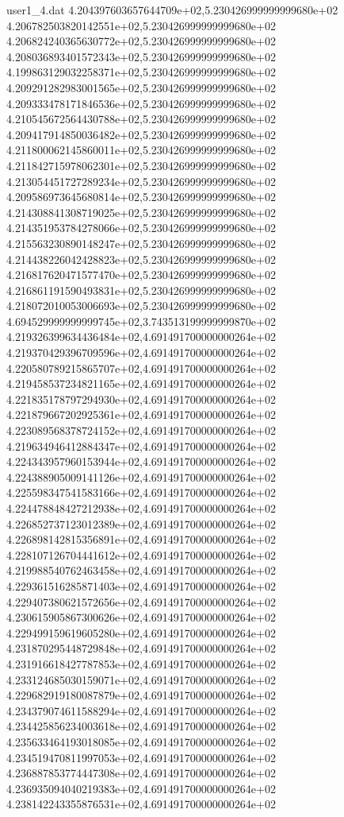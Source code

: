\begin{filecontents}{user1_4.dat}
4.204397603657644709e+02,5.230426999999999680e+02
4.206782503820142551e+02,5.230426999999999680e+02
4.206824240365630772e+02,5.230426999999999680e+02
4.208036893401572343e+02,5.230426999999999680e+02
4.199863129032258371e+02,5.230426999999999680e+02
4.209291282983001565e+02,5.230426999999999680e+02
4.209333478171846536e+02,5.230426999999999680e+02
4.210545672564430788e+02,5.230426999999999680e+02
4.209417914850036482e+02,5.230426999999999680e+02
4.211800062145860011e+02,5.230426999999999680e+02
4.211842715978062301e+02,5.230426999999999680e+02
4.213054451727289234e+02,5.230426999999999680e+02
4.209586973645680814e+02,5.230426999999999680e+02
4.214308841308719025e+02,5.230426999999999680e+02
4.214351953784278066e+02,5.230426999999999680e+02
4.215563230890148247e+02,5.230426999999999680e+02
4.214438226042428823e+02,5.230426999999999680e+02
4.216817620471577470e+02,5.230426999999999680e+02
4.216861191590493831e+02,5.230426999999999680e+02
4.218072010053006693e+02,5.230426999999999680e+02
4.694529999999999745e+02,3.743513199999999870e+02
4.219326399634436484e+02,4.691491700000000264e+02
4.219370429396709596e+02,4.691491700000000264e+02
4.220580789215865707e+02,4.691491700000000264e+02
4.219458537234821165e+02,4.691491700000000264e+02
4.221835178797294930e+02,4.691491700000000264e+02
4.221879667202925361e+02,4.691491700000000264e+02
4.223089568378724152e+02,4.691491700000000264e+02
4.219634946412884347e+02,4.691491700000000264e+02
4.224343957960153944e+02,4.691491700000000264e+02
4.224388905009141126e+02,4.691491700000000264e+02
4.225598347541583166e+02,4.691491700000000264e+02
4.224478848427212938e+02,4.691491700000000264e+02
4.226852737123012389e+02,4.691491700000000264e+02
4.226898142815356891e+02,4.691491700000000264e+02
4.228107126704441612e+02,4.691491700000000264e+02
4.219988540762463458e+02,4.691491700000000264e+02
4.229361516285871403e+02,4.691491700000000264e+02
4.229407380621572656e+02,4.691491700000000264e+02
4.230615905867300626e+02,4.691491700000000264e+02
4.229499159619605280e+02,4.691491700000000264e+02
4.231870295448729848e+02,4.691491700000000264e+02
4.231916618427787853e+02,4.691491700000000264e+02
4.233124685030159071e+02,4.691491700000000264e+02
4.229682919180087879e+02,4.691491700000000264e+02
4.234379074611588294e+02,4.691491700000000264e+02
4.234425856234003618e+02,4.691491700000000264e+02
4.235633464193018085e+02,4.691491700000000264e+02
4.234519470811997053e+02,4.691491700000000264e+02
4.236887853774447308e+02,4.691491700000000264e+02
4.236935094040219383e+02,4.691491700000000264e+02
4.238142243355876531e+02,4.691491700000000264e+02

\end{filecontents}

